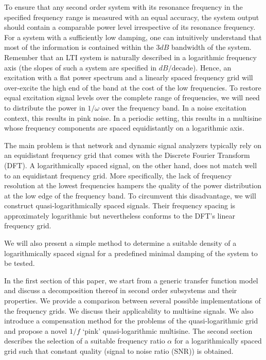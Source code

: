   To ensure that any second order system with its resonance frequency in the specified frequency range is measured with an equal accuracy, the system output should contain a comparable power level irrespective of its resonance frequency.
  For a system with a sufficiently low damping, one can intuitively understand that most of the information is contained within the $3 \unit{dB}$ bandwidth of the system.
  Remember that an \gls{LTI} system is naturally described in a logarithmic frequency axis (the slopes of such a system are specified in $\unit{dB}/\text{decade}$).
  Hence, an excitation with a flat power spectrum and a linearly spaced frequency grid will over-excite the high end of the band at the cost of the low frequencies.
  To restore equal excitation signal levels over the complete range of frequencies, we will need to distribute the power in $1/\omega$ over the frequency band.
  In a noise excitation context, this results in pink noise.
  In a periodic setting, this results in a multisine whose frequency components are spaced equidistantly on a logarithmic axis.
  
  The main problem is that network and dynamic signal analyzers typically
  rely on an equidistant frequency grid that comes with the Discrete Fourier Transform (DFT).
  A logarithmically spaced signal, on the other hand, does not match well to an equidistant frequency grid.
  More specifically, the lack of frequency resolution at the lowest frequencies hampers the quality of the power distribution at the low edge of the frequency band.
  To circumvent this disadvantage, we will construct quasi-logarithmically spaced signals.
  Their frequency spacing is approximately logarithmic but nevertheless conforms to the DFT's linear frequency grid.

  We will also present a simple method to determine a suitable density of a logarithmically spaced signal for a predefined minimal damping of the system to be tested.

  In the first section of this paper, we start from a generic transfer function model and discuss a decomposition thereof in second order subsystems and their properties.
  We provide a comparison between several possible implementations of the frequency grids.
  We discuss their applicability to multisine signals.
  We also introduce a compensation method for the problems of the quasi-logarithmic grid and propose a novel $1/f$ `pink' quasi-logarithmic multisine.
  The second section describes the selection of a suitable frequency ratio $\alpha$ for a logarithmically spaced grid such that constant quality (signal to noise ratio (SNR)) is obtained.

